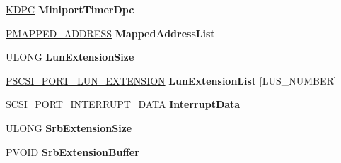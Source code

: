 \begin{DoxyCompactItemize}
\hyperlink{struct___k_d_p_c}{K\+D\+PC} {\bfseries Miniport\+Timer\+Dpc}
\item 
\mbox{\label{struct___s_c_s_i___p_o_r_t___d_e_v_i_c_e___e_x_t_e_n_s_i_o_n_ab77e92aa9a84f45c8ed438e851603903}} 
\hyperlink{struct___m_a_p_p_e_d___a_d_d_r_e_s_s}{P\+M\+A\+P\+P\+E\+D\+\_\+\+A\+D\+D\+R\+E\+SS} {\bfseries Mapped\+Address\+List}
\item 
\mbox{\label{struct___s_c_s_i___p_o_r_t___d_e_v_i_c_e___e_x_t_e_n_s_i_o_n_a6e2d764f3405f81b26d0dfc72aa4b397}} 
U\+L\+O\+NG {\bfseries Lun\+Extension\+Size}
\item 
\mbox{\label{struct___s_c_s_i___p_o_r_t___d_e_v_i_c_e___e_x_t_e_n_s_i_o_n_a3872333c3e7904f41aa5652ff7761916}} 
\hyperlink{struct___s_c_s_i___p_o_r_t___l_u_n___e_x_t_e_n_s_i_o_n}{P\+S\+C\+S\+I\+\_\+\+P\+O\+R\+T\+\_\+\+L\+U\+N\+\_\+\+E\+X\+T\+E\+N\+S\+I\+ON} {\bfseries Lun\+Extension\+List} \mbox{[}L\+U\+S\+\_\+\+N\+U\+M\+B\+ER\mbox{]}
\item 
\mbox{\label{struct___s_c_s_i___p_o_r_t___d_e_v_i_c_e___e_x_t_e_n_s_i_o_n_a378ee899151a13083f66f45884219551}} 
\hyperlink{struct___s_c_s_i___p_o_r_t___i_n_t_e_r_r_u_p_t___d_a_t_a}{S\+C\+S\+I\+\_\+\+P\+O\+R\+T\+\_\+\+I\+N\+T\+E\+R\+R\+U\+P\+T\+\_\+\+D\+A\+TA} {\bfseries Interrupt\+Data}
\item 
\mbox{\label{struct___s_c_s_i___p_o_r_t___d_e_v_i_c_e___e_x_t_e_n_s_i_o_n_aee36c236e54885864b5fd1f67b0ecbc5}} 
U\+L\+O\+NG {\bfseries Srb\+Extension\+Size}
\item 
\mbox{\label{struct___s_c_s_i___p_o_r_t___d_e_v_i_c_e___e_x_t_e_n_s_i_o_n_af0c45001b9320556904d7851a013547d}} 
\hyperlink{interfacevoid}{P\+V\+O\+ID} {\bfseries Srb\+Extension\+Buffer}
\item 
\mbox{\label{struct___s_c_s_i___p_o_r_t___d_e_v_i_c_e___e_x_t_e_n_s_i_o_n_a40e7f67dfdbf695639ab388634381bb2}} 

\end{DoxyCompactItemize}
